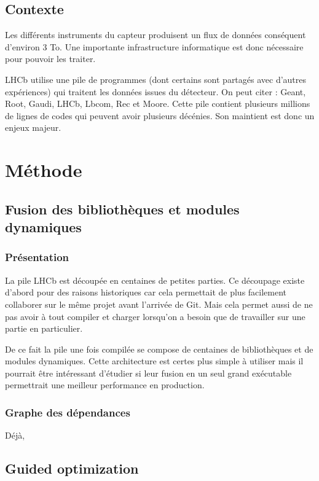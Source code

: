 \documentclass[a4paper,12pt]{report}
\begin{document}
    \section{Contexte}
    Les différents instruments du capteur produisent un flux de données conséquent d'environ 3 To.
    Une importante infrastructure informatique est donc nécessaire pour pouvoir les traiter.

    LHCb utilise une pile de programmes (dont certains sont partagés avec d'autres expériences) qui traitent les données issues du détecteur.
    On peut citer : Geant, Root, Gaudi, LHCb, Lbcom, Rec et Moore.
    Cette pile contient plusieurs millions de lignes de codes qui peuvent avoir plusieurs décénies.
    Son maintient est donc un enjeux majeur.



\chapter{Méthode}
    \section{Fusion des bibliothèques et modules dynamiques}
        \subsection{Présentation}
            La pile LHCb est découpée en centaines de petites parties.
            Ce découpage existe d'abord pour des raisons historiques car cela permettait de plus facilement collaborer sur le même projet avant l'arrivée de Git.
            Mais cela permet aussi de ne pas avoir à tout compiler et charger lorsqu'on a besoin que de travailler sur une partie en particulier.

            De ce fait la pile une fois compilée se compose de centaines de bibliothèques et de modules dynamiques.
            Cette architecture est certes plus simple à utiliser mais il pourrait être intéressant d'étudier si leur fusion en un seul grand exécutable permettrait une meilleur performance en production.

        \subsection{Graphe des dépendances}
            Déjà,

    \section{Guided optimization}
\end{document}
